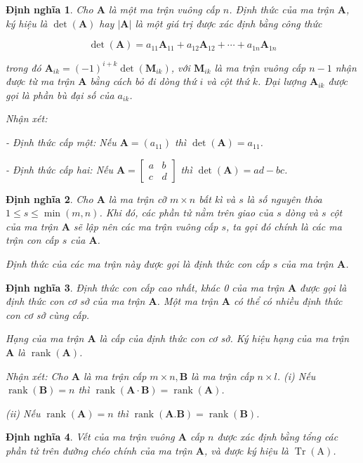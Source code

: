 \documentclass[12pt,a4paper,oneside]{report}
\newtheorem{dn}{Định nghĩa}[section]
\numberwithin{equation}{section}
\begin{document}
\begin{dn}\rm 
	Cho $\mathbf{A}$ là một ma trận vuông cấp $n$. Định thức của ma trận $\mathbf{A}$, ký hiệu là $\operatorname{det}(\mathbf{A})$ hay $|\mathbf{A}|$ là một giá trị được xác định bằng công thức
	
	$$
	\operatorname{det}(\mathbf{A})=a_{11} \mathbf{A}_{11}+a_{12} \mathbf{A}_{12}+\cdots+a_{1 n} \mathbf{A}_{1 n}
	$$
	
	trong đó $\mathbf{A}_{i k}=(-1)^{i+k} \operatorname{det}\left(\mathbf{M}_{i k}\right)$, với $\mathbf{M}_{i k}$ là ma trận vuông cấp $n-1$ nhận được từ ma trận $\mathbf{A}$ bằng cách bỏ đi dòng thứ $i$ và cột thứ $k$. Đại lượng $\mathbf{A}_{i k}$ được gọi là phần bù đại số của $a_{i k}$.
	
	Nhận xét:
	
	- Định thức cấp một: Nếu $\mathbf{A}=\left(a_{11}\right)$ thì $\operatorname{det}(\mathbf{A})=a_{11}$.
	
	- Định thức cấp hai: Nếu $\mathbf{A}=\left[\begin{array}{ll}a & b \\ c & d\end{array}\right]$ thì $\operatorname{det}(\mathbf{A})=a d-b c$.
\end{dn}
\begin{dn}\rm 
	Cho $\mathbf{A}$ là ma trận cỡ $m \times n$ bất kì và $s$ là số nguyên thỏa $1 \leqslant s \leqslant \min (m, n)$. Khi đó, các phần tử nằm trên giao của $s$ dòng và $s$ cột của ma trận $\mathbf{A}$ sẽ lập nên các ma trận vuông cấp $s$, ta gọi đó chính là các ma trận con cấp $s$ của $\mathbf{A}$.
	
	Định thức của các ma trận này được gọi là định thức con cấp $s$ của ma trận $\mathbf{A}$.
\end{dn}
\begin{dn}\rm 
	 Định thức con cấp cao nhất, khác 0 của ma trận $\mathbf{A}$ được gọi là định thức con cơ sở của ma trận $\mathbf{A}$. Một ma trận $\mathbf{A}$ có thể có nhiều định thức con cơ sở cùng cấp.
	
	Hạng của ma trận $\mathbf{A}$ là cấp của định thức con cơ sở. Ký hiệu hạng của ma trận $\mathbf{A}$ là $\operatorname{rank}(\mathbf{A})$.
	
	Nhận xét: Cho $\mathbf{A}$ là ma trận cấp $m \times n, \mathbf{B}$ là ma trận cấp $n \times l$. (i) Nếu $\operatorname{rank}(\mathbf{B})=n$ thì $\operatorname{rank}(\mathbf{A} \cdot \mathbf{B})=\operatorname{rank}(\mathbf{A})$.
	
	(ii) Nếu $\operatorname{rank}(\mathbf{A})=n$ thì $\operatorname{rank}(\mathbf{A} . \mathbf{B})=\operatorname{rank}(\mathbf{B})$.
\end{dn}
\begin{dn}\rm 
	Vết của ma trận vuông $\mathbf{A}$ cấp $n$ được xác định bằng tổng các phần tử trên đường chéo chính của ma trận $\mathbf{A}$, và được ký hiệu là $\operatorname{Tr}(\mathrm{A})$.
\end{dn}
\end{document}
